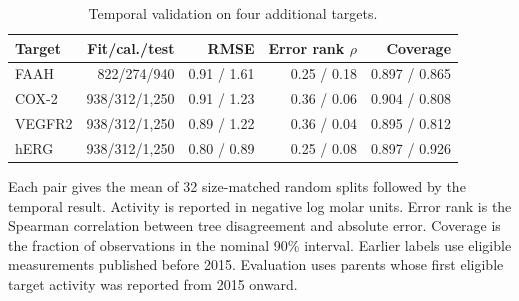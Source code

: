 \begin{table}[htbp]
\centering
\caption{Temporal validation on four additional targets.}
\label{tab:extension-temporal}
\small
\begin{tabular}{lrrrr}
\toprule
Target & Fit/cal./test & RMSE & Error rank $\rho$ & Coverage \\
\midrule
FAAH & 822/274/940 & 0.91 / 1.61 & 0.25 / 0.18 & 0.897 / 0.865 \\
COX-2 & 938/312/1,250 & 0.91 / 1.23 & 0.36 / 0.06 & 0.904 / 0.808 \\
VEGFR2 & 938/312/1,250 & 0.89 / 1.22 & 0.36 / 0.04 & 0.895 / 0.812 \\
hERG & 938/312/1,250 & 0.80 / 0.89 & 0.25 / 0.08 & 0.897 / 0.926 \\
\bottomrule
\end{tabular}
\par\smallskip
\begin{minipage}{0.98\linewidth}\footnotesize Each pair gives the mean of 32 size-matched random splits followed by the temporal result. Activity is reported in negative log molar units. Error rank is the Spearman correlation between tree disagreement and absolute error. Coverage is the fraction of observations in the nominal 90\% interval. Earlier labels use eligible measurements published before 2015. Evaluation uses parents whose first eligible target activity was reported from 2015 onward.\end{minipage}
\end{table}
